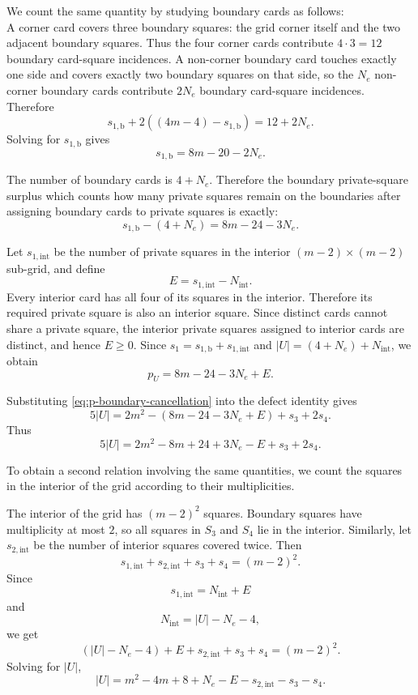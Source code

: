 \documentclass[11pt]{article}
\begin{document}
	We count the same quantity by studying boundary cards as follows:\\
	A corner card covers
	three boundary squares: the grid corner itself and the two adjacent boundary
	squares.  Thus the four corner cards contribute \(4\cdot3=12\) boundary
	card-square incidences.  A non-corner boundary card touches exactly one side
	and covers exactly two boundary squares on that side, so the \(N_e\)
	non-corner boundary cards contribute \(2N_e\) boundary card-square incidences.
	Therefore
	\[
	s_{1,\mathrm{b}}+2((4m-4)-s_{1,\mathrm{b}})=12+2N_e.
	\]
	Solving for $s_{1,\mathrm{b}}$ gives
	\begin{equation}
		{s_{1,\mathrm{b}}=8m-20-2N_e.}
		\label{eq:Pb}
	\end{equation}
	
	The number of boundary cards is \(4+N_e\). Therefore the boundary private-square surplus which counts how many private squares remain on the boundaries after assigning boundary cards to private squares is exactly:
	\[
	s_{1,\mathrm{b}}-(4+N_e)=8m-24-3N_e.
	\]
	
	Let \(s_{1,\mathrm{int}}\) be the number of private squares in the interior \((m-2)\times(m-2)\) sub-grid, and define
	\[
	E=s_{1,\mathrm{int}}-N_{\mathrm{int}}.
	\]
	Every interior card has all four of its squares in the interior.  Therefore
	its required private square is also an interior square.  Since distinct cards
	cannot share a private square, the interior private squares assigned to
	interior cards are distinct, and hence $E\ge0.$
	Since $s_1=s_{1,\mathrm{b}}+s_{1,\mathrm{int}}$
	and $|U|=(4+N_e)+N_{\mathrm{int}}$,
	we obtain
	\begin{equation}
		{p_U=8m-24-3N_e+E.}
		\label{eq:p-boundary-cancellation}
	\end{equation}
	
	
	Substituting \eqref{eq:p-boundary-cancellation} into the defect identity gives
	\[
	5|U|
	=
	2m^2-(8m-24-3N_e+E)+s_3+2s_4.
	\]
	Thus
	\begin{equation}
		{
			5|U|
			=
			2m^2-8m+24+3N_e-E+s_3+2s_4.
		}
		\label{eq:first-general}
	\end{equation}
	
	To obtain a second relation involving the same quantities, we count the squares in the interior of the grid according to their multiplicities.
	
	The interior of the grid has \((m-2)^2\) squares. Boundary squares have multiplicity at most \(2\), so all squares in \(S_3\) and \(S_4\) lie in the interior. Similarly, let \(s_{2,\mathrm{int}}\) be the number of interior squares covered twice. Then
	\[
	s_{1,\mathrm{int}}+s_{2,\mathrm{int}}+s_3+s_4=(m-2)^2.
	\]
	Since
	\[
	s_{1,\mathrm{int}}=N_{\mathrm{int}}+E
	\]
	and
	\[
	N_{\mathrm{int}}=|U|-N_e-4,
	\]
	we get
	\[
	(|U|-N_e-4)+E+s_{2,\mathrm{int}}+s_3+s_4=(m-2)^2.
	\]
	Solving for \(|U|\),
	\begin{equation}
		{
			|U|
			=
			m^2-4m+8+N_e-E-s_{2,\mathrm{int}}-s_3-s_4.
		}
		\label{eq:second-general}
	\end{equation}
	
\end{document}
